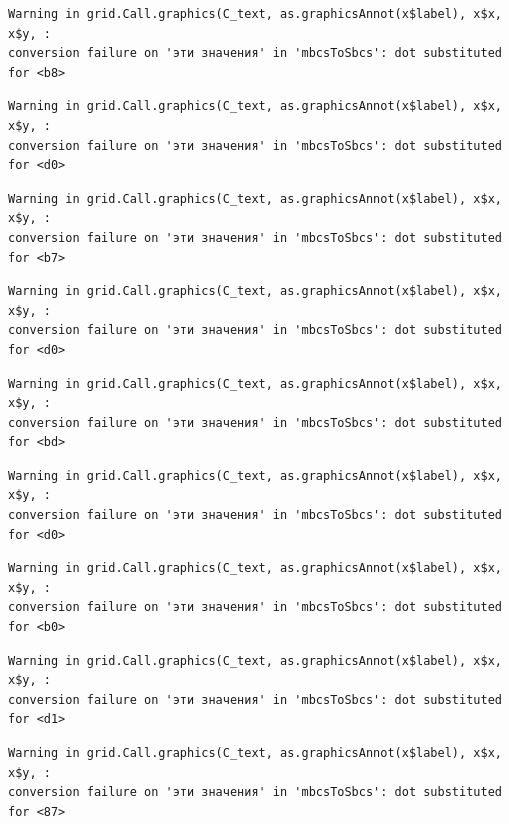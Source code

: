 \documentclass[
  letterpaper,
  DIV=11,
  numbers=noendperiod]{scrreprt}
\theoremstyle{definition}
\theoremstyle{remark}
\begin{document}
\begin{verbatim}
Warning in grid.Call.graphics(C_text, as.graphicsAnnot(x$label), x$x, x$y, :
conversion failure on 'эти значения' in 'mbcsToSbcs': dot substituted for <b8>
\end{verbatim}

\begin{verbatim}
Warning in grid.Call.graphics(C_text, as.graphicsAnnot(x$label), x$x, x$y, :
conversion failure on 'эти значения' in 'mbcsToSbcs': dot substituted for <d0>
\end{verbatim}

\begin{verbatim}
Warning in grid.Call.graphics(C_text, as.graphicsAnnot(x$label), x$x, x$y, :
conversion failure on 'эти значения' in 'mbcsToSbcs': dot substituted for <b7>
\end{verbatim}

\begin{verbatim}
Warning in grid.Call.graphics(C_text, as.graphicsAnnot(x$label), x$x, x$y, :
conversion failure on 'эти значения' in 'mbcsToSbcs': dot substituted for <d0>
\end{verbatim}

\begin{verbatim}
Warning in grid.Call.graphics(C_text, as.graphicsAnnot(x$label), x$x, x$y, :
conversion failure on 'эти значения' in 'mbcsToSbcs': dot substituted for <bd>
\end{verbatim}

\begin{verbatim}
Warning in grid.Call.graphics(C_text, as.graphicsAnnot(x$label), x$x, x$y, :
conversion failure on 'эти значения' in 'mbcsToSbcs': dot substituted for <d0>
\end{verbatim}

\begin{verbatim}
Warning in grid.Call.graphics(C_text, as.graphicsAnnot(x$label), x$x, x$y, :
conversion failure on 'эти значения' in 'mbcsToSbcs': dot substituted for <b0>
\end{verbatim}

\begin{verbatim}
Warning in grid.Call.graphics(C_text, as.graphicsAnnot(x$label), x$x, x$y, :
conversion failure on 'эти значения' in 'mbcsToSbcs': dot substituted for <d1>
\end{verbatim}

\begin{verbatim}
Warning in grid.Call.graphics(C_text, as.graphicsAnnot(x$label), x$x, x$y, :
conversion failure on 'эти значения' in 'mbcsToSbcs': dot substituted for <87>
\end{verbatim}
\end{document}
